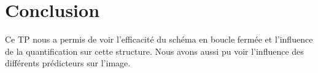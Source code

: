 \documentclass[12pt]{report}
\begin{document}
\section{Conclusion}

Ce TP nous a permis de voir l’efficacité du schéma en boucle fermée et l'influence de la quantification sur cette structure. Nous avons aussi pu voir l'influence des différents prédicteurs sur l'image.

\newpage



\renewcommand*\listfigurename{\large Liste des figures}
\listoffigures
\newpage
\end{document}
